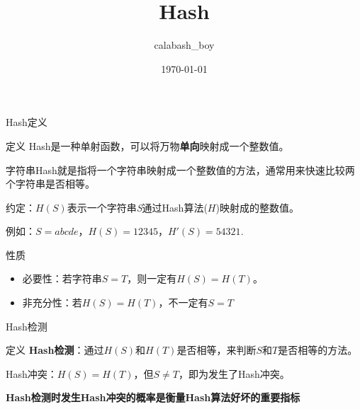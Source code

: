\documentclass{ctexbeamer}		%
\date{}	%
\title[String]{Hash}	%
\author[calabash\_boy]{calabash\_boy} %
\date{\today}
\begin{document}


\begin{frame}	

\titlepage	%
	
\end{frame}		

\begin{frame}{Hash定义}
    
\begin{block}{定义}
Hash是一种单射函数，可以将万物\textbf{单向}映射成一个整数值。

\pause
字符串Hash就是指将一个字符串映射成一个整数值的方法，通常用来快速比较两个字符串是否相等。

约定：$H(S)$表示一个字符串\textit{S}通过Hash算法($H$)映射成的整数值。

\pause

例如：$S = abcde$，$H(S) = 12345$，$H'(S) = 54321$.
\end{block}

\pause

\begin{block}{性质}

\begin{itemize}
    \item 必要性：若字符串$S = T$，则一定有$H(S) = H(T)$。
    \item 非充分性：若$H(S) = H(T)$，不一定有$S=T$
\end{itemize}

\end{block}

\end{frame}

\begin{frame}{Hash检测}
\begin{block}{定义}
\textbf{Hash检测}：通过$H(S)$和$H(T)$是否相等，来判断$S$和$T$是否相等的方法。
\hphantom{}

Hash冲突：$H(S) = H(T)$，但$S \neq T$，即为发生了Hash冲突。

{\color{red}\textbf{Hash检测时发生Hash冲突的概率是衡量Hash算法好坏的重要指标}}
\end{block}
\end{frame}
\end{document}
